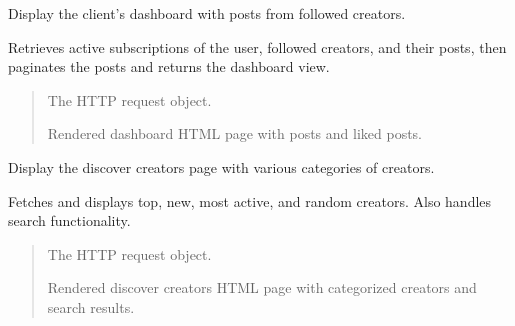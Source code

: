 \documentclass[letterpaper,10pt,english]{sphinxmanual}
\begin{document}
\begin{fulllineitems}
\label{\detokenize{modules/views:client.views.dashboard}}
\pysigstartsignatures
{}
\pysigstopsignatures
\sphinxAtStartPar
Display the client’s dashboard with posts from followed creators.

\sphinxAtStartPar
Retrieves active subscriptions of the user, followed creators, and their posts,
then paginates the posts and returns the dashboard view.
\begin{quote}\begin{description}
\sphinxAtStartPar
{} \textendash{} The HTTP request object.

\sphinxAtStartPar
Rendered dashboard HTML page with posts and liked posts.

\end{description}\end{quote}

\end{fulllineitems}


\begin{fulllineitems}
\label{\detokenize{modules/views:client.views.discover_creators}}
\pysigstartsignatures
{}
\pysigstopsignatures
\sphinxAtStartPar
Display the discover creators page with various categories of creators.

\sphinxAtStartPar
Fetches and displays top, new, most active, and random creators. Also handles search functionality.
\begin{quote}\begin{description}
\sphinxAtStartPar
{} \textendash{} The HTTP request object.

\sphinxAtStartPar
Rendered discover creators HTML page with categorized creators and search results.

\end{description}\end{quote}

\end{fulllineitems}
\end{document}
